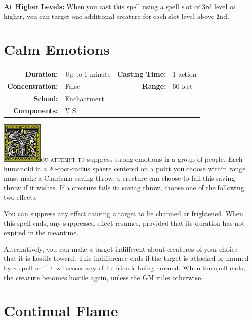 \documentclass[12pt,showtrims]{memoir}
\begin{document}
\vspace{8pt} \noindent\textbf{At Higher Levels:} When you cast this spell using a spell slot of 3rd level or higher, you can target one additional creature for each slot level above 2nd.
\newpage
\section*{Calm Emotions}
{
\small\centering\vspace{-6pt}
\begin{tabular}{rlrl}
\toprule

\textbf{Duration:} & Up to 1 minute &
\textbf{Casting Time:} & 1 action \\
\textbf{Concentration:} & False &
\textbf{Range:} & 60 feet \\
\textbf{School:} & Enchantment  \\
\textbf{Components:} & \multicolumn{3}{p{0.7\textwidth}}{V S}\\

\bottomrule
\end{tabular}
}
\vspace{1\baselineskip}\noindent
\lettrine[lines=4]{\includegraphics[height=58pt]{initials/Y.png}}{ou attempt to} suppress strong emotions in a group of people. Each humanoid in a 20-foot-radius sphere centered on a point you choose within range must make a Charisma saving throw; a creature can choose to fail this saving throw if it wishes. If a creature fails its saving throw, choose one of the following two effects.

You can suppress any effect causing a target to be charmed or frightened. When this spell ends, any suppressed effect resumes, provided that its duration has not expired in the meantime.

Alternatively, you can make a target indifferent about creatures of your choice that it is hostile toward. This indifference ends if the target is attacked or harmed by a spell or if it witnesses any of its friends being harmed. When the spell ends, the creature becomes hostile again, unless the GM rules otherwise.

\newpage
\section*{Continual Flame}
\end{document}
